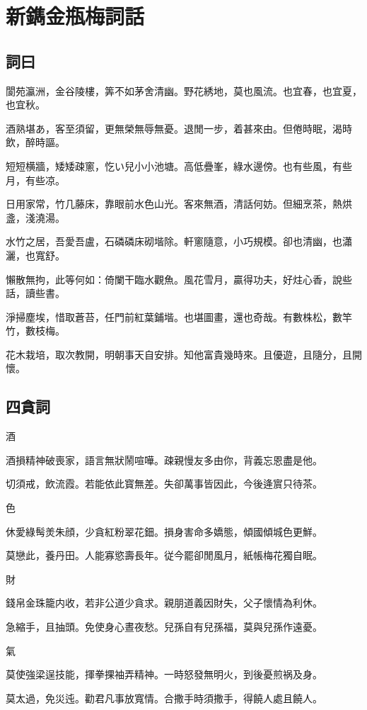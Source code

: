 \chapter*{新鐫金瓶梅詞話}


\section*{詞曰}

\begin{myquote0}
閬苑瀛洲，金谷陵樓，筭不如茅舍清幽。野花綉地，莫也風流。也宜春，也宜夏，也宜秋。

酒熟堪あ，客至須留，更無榮無辱無憂。退閒一步，着甚來由。但倦時眠，渴時飲，醉時謳。

短短横牆，矮矮疎窻，忔い兒小小池塘。高低疊峯，綠水邊傍。也有些風，有些月，有些凉。

日用家常，竹几藤床，靠眼前水色山光。客來無酒，清話何妨。但細烹茶，熱烘盞，淺澆湯。

水竹之居，吾愛吾盧，石磷磷床砌堦除。軒窻隨意，小巧規模。卻也清幽，也瀟灑，也寬舒。

懶散無拘，此等何如：倚闌干臨水觀魚。風花雪月，贏得功夫，好炷心香，說些話，讀些書。

淨掃塵埃，惜取蒼苔，任門前紅葉鋪堦。也堪圖畫，還也奇哉。有數株松，數竿竹，數枝梅。

花木栽培，取次教開，明朝事天自安排。知他富貴幾時來。且優遊，且隨分，且開懷。
\end{myquote0}

\newpage\section*{四貪詞}

\hspace*{1em}酒

\begin{myquote0}
酒損精神破喪家，語言無狀鬧喧嘩。疎親慢友多由你，背義忘恩盡是他。

切須戒，飲流霞。若能依此寳無差。失卻萬事皆因此，今後逄賔只待茶。
\end{myquote0}

\hspace*{1em}色

\begin{myquote0}
休愛綠髩羙朱顔，少貪紅粉翠花鈿。損身害命多嬌態，傾國傾城色更鮮。

莫戀此，養丹田。人能寡慾壽長年。従今罷卻閒風月，紙帳梅花獨自眠。
\end{myquote0}

\hspace*{1em}財

\begin{myquote0}
錢帛金珠籠内收，若非公道少貪求。親朋道義因財失，父子懷情為利休。

急縮手，且抽頭。免使身心晝夜愁。兒孫自有兒孫福，莫與兒孫作遠憂。
\end{myquote0}

\hspace*{1em}氣

\begin{myquote0}
莫使強梁逞技能，揮拳捰袖弄精神。一時怒發無明火，到後憂煎祸及身。

莫太過，免災迍。勸君凡事放寬情。合撒手時須撒手，得饒人處且饒人。
\end{myquote0}


